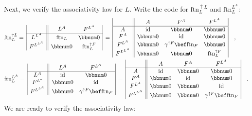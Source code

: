 Next, we verify the associativity law for $L$. Write the code for
$\text{ftn}_{L}^{\uparrow L}$ and $\text{ftn}_{L}^{L^{A}}$:
\begin{align*}
 & \text{ftn}_{L}^{\uparrow L}=\,\begin{array}{|c||cc|}
 & L^{A} & F^{L^{A}}\\
\hline L^{L^{A}} & \text{ftn}_{L} & \bbnum 0\\
F^{L^{L^{A}}} & \bbnum 0 & \text{ftn}_{L}^{\uparrow F}
\end{array}\,=\,\begin{array}{|c||ccc|}
 & A & F^{A} & F^{L^{A}}\\
\hline A & \text{id} & \bbnum 0 & \bbnum 0\\
F^{A} & \bbnum 0 & \text{id} & \bbnum 0\\
F^{L^{A}} & \bbnum 0 & \gamma^{\uparrow F}\bef\text{ftn}_{F} & \bbnum 0\\
F^{L^{L^{A}}} & \bbnum 0 & \bbnum 0 & \text{ftn}_{L}^{\uparrow F}
\end{array}\quad,\\
 & \text{ftn}_{L}^{L^{A}}=\,\begin{array}{|c||cc|}
 & L^{A} & F^{L^{A}}\\
\hline L^{A} & \text{id} & \bbnum 0\\
F^{L^{a}} & \bbnum 0 & \text{id}\\
F^{L^{L^{A}}} & \bbnum 0 & \gamma^{\uparrow F}\bef\text{ftn}_{F}
\end{array}\,=\,\begin{array}{|c||ccc|}
 & A & F^{A} & F^{L^{A}}\\
\hline A & \text{id} & \bbnum 0 & \bbnum 0\\
F^{A} & \bbnum 0 & \text{id} & \bbnum 0\\
F^{L^{A}} & \bbnum 0 & \bbnum 0 & \text{id}\\
F^{L^{L^{A}}} & \bbnum 0 & \bbnum 0 & \gamma^{\uparrow F}\bef\text{ftn}_{F}
\end{array}\quad.
\end{align*}
We are ready to verify the associativity law:

